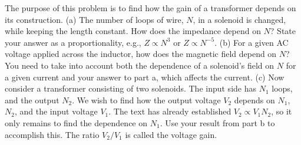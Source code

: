 The purpose of this problem is to find how the gain of a transformer
        depends on its construction.\hwendpart
        (a) The number of loops of wire, $N$, in a solenoid is changed, 
        while keeping the length constant. How does the impedance
        depend on $N$? State your answer as a proportionality,
        e.g., $Z\propto N^3$ or $Z\propto N^{-5}$.\hwendpart
        (b) For a given AC voltage applied across the inductor, how does the
        magnetic field depend on $N$?
        You need to take into account both the dependence of a solenoid's field on $N$ for a
        given current and your answer to part a, which affects the current.\hwendpart
        (c) Now consider a transformer consisting of two solenoids. The input
        side has $N_1$ loops, and the output $N_2$. We wish to find how the
        output voltage $V_2$ depends on $N_1$, $N_2$, and the input voltage
        $V_1$. The text has already established $V_2\propto V_1N_2$, so it only
        remains to find the dependence on $N_1$. Use your result from part b
        to accomplish this. The ratio $V_2/V_1$ is called the voltage gain.
